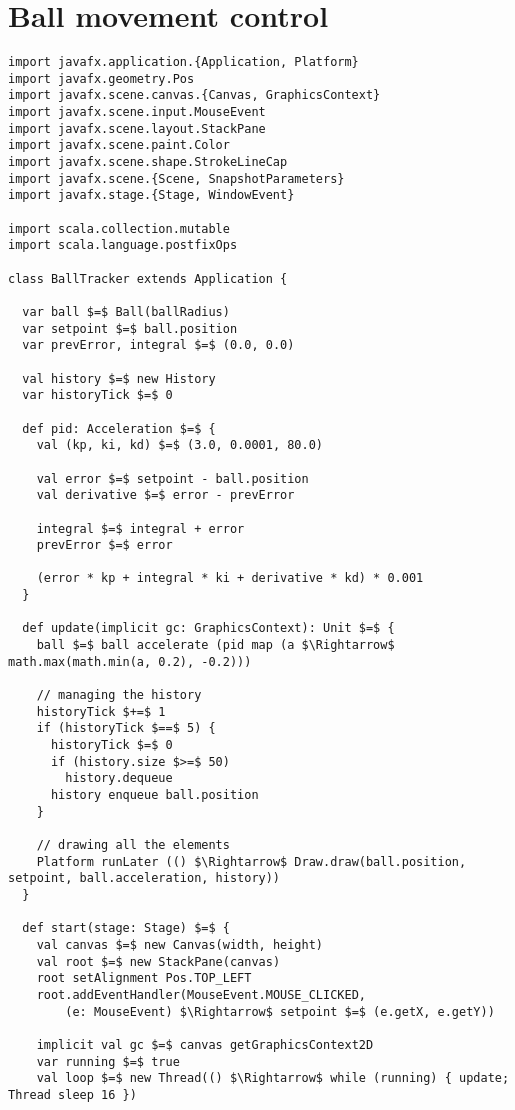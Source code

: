 \chapter{Ball movement control}

\begin{lstlisting}[style=ScalaStyle, caption={Ball movement control}, label={lst:ball-full}]
import javafx.application.{Application, Platform}
import javafx.geometry.Pos
import javafx.scene.canvas.{Canvas, GraphicsContext}
import javafx.scene.input.MouseEvent
import javafx.scene.layout.StackPane
import javafx.scene.paint.Color
import javafx.scene.shape.StrokeLineCap
import javafx.scene.{Scene, SnapshotParameters}
import javafx.stage.{Stage, WindowEvent}

import scala.collection.mutable
import scala.language.postfixOps

class BallTracker extends Application {

  var ball $=$ Ball(ballRadius)
  var setpoint $=$ ball.position
  var prevError, integral $=$ (0.0, 0.0)

  val history $=$ new History
  var historyTick $=$ 0

  def pid: Acceleration $=$ {
    val (kp, ki, kd) $=$ (3.0, 0.0001, 80.0)

    val error $=$ setpoint - ball.position
    val derivative $=$ error - prevError

    integral $=$ integral + error
    prevError $=$ error

    (error * kp + integral * ki + derivative * kd) * 0.001
  }

  def update(implicit gc: GraphicsContext): Unit $=$ {
    ball $=$ ball accelerate (pid map (a $\Rightarrow$ math.max(math.min(a, 0.2), -0.2)))

    // managing the history
    historyTick $+=$ 1
    if (historyTick $==$ 5) {
      historyTick $=$ 0
      if (history.size $>=$ 50)
        history.dequeue
      history enqueue ball.position
    }

    // drawing all the elements
    Platform runLater (() $\Rightarrow$ Draw.draw(ball.position, setpoint, ball.acceleration, history))
  }

  def start(stage: Stage) $=$ {
    val canvas $=$ new Canvas(width, height)
    val root $=$ new StackPane(canvas)
    root setAlignment Pos.TOP_LEFT
    root.addEventHandler(MouseEvent.MOUSE_CLICKED,
        (e: MouseEvent) $\Rightarrow$ setpoint $=$ (e.getX, e.getY))

    implicit val gc $=$ canvas getGraphicsContext2D
    var running $=$ true
    val loop $=$ new Thread(() $\Rightarrow$ while (running) { update; Thread sleep 16 })


\end{lstlisting}
